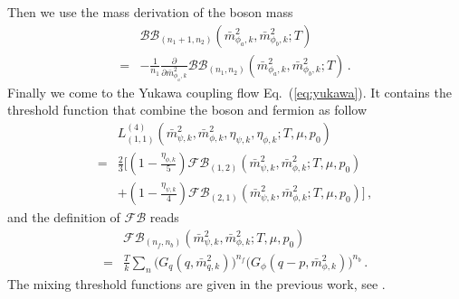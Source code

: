 \documentclass[%
reprint,
superscriptaddress,
showpacs,preprintnumbers,
 amsmath,amssymb,
 aps,
prd,
]{revtex4-1}
\def\Eq#1{Eq.~(\ref{#1})}
\begin{document}
Then we use the mass derivation of the boson mass
\begin{align}
  &\mathcal{BB}_{(n_1+1,n_2)}(\bar{m}^{2}_{\phi_a,k},\bar{m}^{2}_{\phi_b,k};T)\nonumber\\[2ex]
  =&-\frac{1}{n_1}\frac{\partial}{\partial \bar{m}^{2}_{\phi_a,k}}\mathcal{BB}_{(n_1,n_2)}(\bar{m}^{2}_{\phi_a,k},\bar{m}^{2}_{\phi_b,k};T)\,.
\end{align}
Finally we come to the Yukawa coupling flow \Eq{eq:yukawa}. It contains the threshold function that combine the boson and fermion as follow
\begin{align}
  &L^{(4)}_{(1,1)}(\bar{m}^{2}_{\psi,k},\bar{m}^{2}_{\phi,k},\eta_{\psi,k},\eta_{\phi,k};T,\mu,p_0)\nonumber\\[2ex]
  =&\frac{2}{3}\bigg[\left(1-\frac{\eta_{\phi,k}}{5}\right)\mathcal{FB}_{(1,2)}(\bar{m}^{2}_{\psi,k},\bar{m}^{2}_{\phi,k};T,\mu,p_0)\nonumber\\[2ex]
&+\left(1-\frac{\eta_{\psi,k}}{4}\right)\mathcal{FB}_{(2,1)}(\bar{m}^{2}_{\psi,k},\bar{m}^{2}_{\phi,k};T,\mu,p_0)\bigg]\,,
\end{align} 
and the definition of $\mathcal{FB}$ reads
\begin{align}
 &\mathcal{FB}_{(n_f,n_b)}(\bar{m}^{2}_{\psi,k},\bar{m}^{2}_{\phi,k};T,\mu,p_0)\nonumber \\[2ex] 
  =&\frac{T}{k}\sum_{n}\Big(G_{q}(q,\bar{m}^{2}_{q,k})\Big)^{n_f}\Big(G_{\phi}(q-p,\bar{m}^{2}_{\phi,k})\Big)^{n_b}\,.\label{eq:FB}
\end{align}
The mixing threshold functions are given in the previous work, see \cite{Fu:2015naa}.

\end{document}
